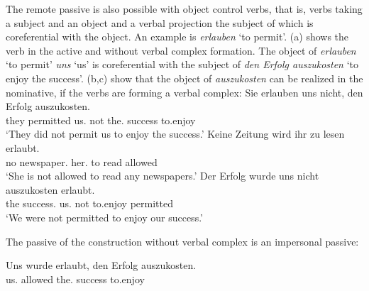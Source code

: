 The remote passive is also possible with object control verbs, that is, verbs taking a subject and
an object and a verbal projection the subject of which is coreferential with the object. An example
is \emph{erlauben} `to permit'. (a) shows the verb in the active and without verbal complex
formation. The object of \emph{erlauben} `to permit' \emph{uns} `us' is coreferential with the
subject of \emph{den Erfolg auszukosten} `to enjoy the success'. (b,c) show that the object
of \emph{auszukosten} can be realized in the nominative, if the verbs are forming a verbal complex:
\eal
\label{bsp-auskosten-fernpassiv}
\ex 
\gll Sie erlauben uns nicht, den Erfolg auszukosten.\\
     they permitted us.\DAT{} not the.\ACC{} success to.enjoy\\
\glt `They did not permit us to enjoy the success.'
\ex{}
\gll Keine Zeitung          wird   ihr       zu lesen erlaubt.\footnotemark\\
     no    newspaper.\NOM{} \AUX{} her.\DAT{} to read  allowed\\
\glt `She is not allowed to read any newspapers.'%
\ex{}
\gll Der Erfolg         wurde  uns       nicht auszukosten erlaubt.\footnotemark\\
     the success.\NOM{} \AUX{} us.\DAT{} not   to.enjoy    permitted\\
\glt `We were not permitted to enjoy our success.'%
\label{bsp-auskosten-fernpassiv-haider}
\zl

\largerpage
\noindent
The passive of the construction without verbal complex is an impersonal passive:

\ea
\gll Uns       wurde  erlaubt, den        Erfolg  auszukosten.\\
     us.\DAT{} \AUX{} allowed  the.\ACC{} success to.enjoy\\
\z


